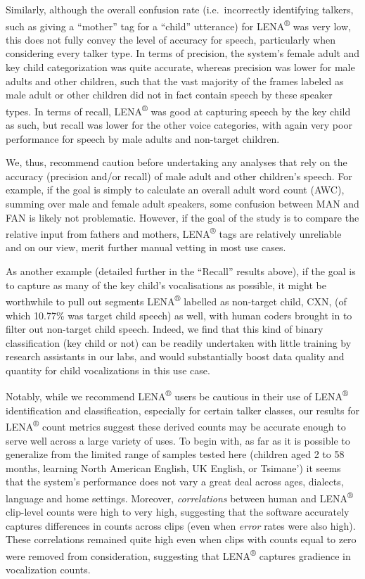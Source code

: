 \documentclass[english,table,man,floatsintext]{apa6}
\begin{document}
Similarly, although the overall confusion rate (i.e.~incorrectly identifying talkers, such as giving a \enquote{mother} tag for a \enquote{child} utterance) for LENA\textsuperscript{®} was very low, this does not fully convey the level of accuracy for speech, particularly when considering every talker type. In terms of precision, the system's female adult and key child categorization was quite accurate, whereas precision was lower for male adults and other children, such that the vast majority of the frames labeled as male adult or other children did not in fact contain speech by these speaker types. In terms of recall, LENA\textsuperscript{®} was good at capturing speech by the key child as such, but recall was lower for the other voice categories, with again very poor performance for speech by male adults and non-target children.

We, thus, recommend caution before undertaking any analyses that rely on the accuracy (precision and/or recall) of male adult and other children's speech. For example, if the goal is simply to calculate an overall adult word count (AWC), summing over male and female adult speakers, some confusion between MAN and FAN is likely not problematic. However, if the goal of the study is to compare the relative input from fathers and mothers, LENA\textsuperscript{®} tags are relatively unreliable and on our view, merit further manual vetting in most use cases.

As another example (detailed further in the \enquote{Recall} results above), if the goal is to capture as many of the key child's vocalisations as possible, it might be worthwhile to pull out segments LENA\textsuperscript{®} labelled as non-target child, CXN, (of which 10.77\% was target child speech) as well, with human coders brought in to filter out non-target child speech. Indeed, we find that this kind of binary classification (key child or not) can be readily undertaken with little training by research assistants in our labs, and would substantially boost data quality and quantity for child vocalizations in this use case.

Notably, while we recommend LENA\textsuperscript{®} users be cautious in their use of LENA\textsuperscript{®} identification and classification, especially for certain talker classes, our results for LENA\textsuperscript{®} count metrics suggest these derived counts may be accurate enough to serve well across a large variety of uses. To begin with, as far as it is possible to generalize from the limited range of samples tested here (children aged 2 to 58 months, learning North American English, UK English, or Tsimane') it seems that the system's performance does not vary a great deal across ages, dialects, language and home settings. Moreover, \emph{correlations} between human and LENA\textsuperscript{®} clip-level counts were high to very high, suggesting that the software accurately captures differences in counts across clips (even when \emph{error} rates were also high). These correlations remained quite high even when clips with counts equal to zero were removed from consideration, suggesting that LENA\textsuperscript{®} captures gradience in vocalization counts.
\end{document}

